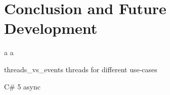 \chapter{Conclusion and Future Development} \newpage a \newpage a

threads_vs_events threads for different use-cases

C# 5 async